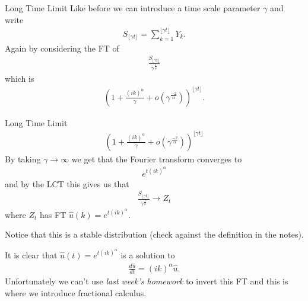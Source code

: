 \documentclass[pdf]{beamer}
\newcommand{\lra}{\longrightarrow}
\begin{document}
\begin{frame}{Long Time Limit}
    Like before we can introduce a time scale parameter $ \gamma $ and write
    \begin{align}
        S_{\lfloor \gamma t \rfloor} = \sum_{k=1}^{\lfloor \gamma t \rfloor}Y_k.
    \end{align}
    Again by considering the FT of 
    \begin{align}
        \frac{S_{\lfloor \gamma t \rfloor}}{\gamma^\frac{1}{\alpha}}
    \end{align}
    which is
    \begin{align}
        \left( 1 + \frac{(ik)^\alpha}{\gamma} + o(\gamma^\frac{-2}{\alpha})\right)^{\lfloor \gamma t \rfloor}.
    \end{align}
\end{frame}

\begin{frame}{Long Time Limit}
    \begin{align}
            \left( 1 + \frac{(ik)^\alpha}{\gamma} + o(\gamma^\frac{-2}{\alpha})\right)^{\lfloor \gamma t \rfloor}
    \end{align}
    By taking $ \gamma \lra \infty $ we get that the Fourier transform converges to
    \begin{align}
        e^{t(ik)^\alpha}
    \end{align}
    and by the LCT this gives us that 
    \begin{align}
        \frac{S_{\lfloor \gamma t \rfloor}}{\gamma^\frac{1}{\alpha}} \lra Z_t
    \end{align}
    where $ Z_t $ has FT $ \hat{u}(k) = e^{t(ik)^\alpha} $.
    
    Notice that this is a stable distribution (check against the definition in the notes).
\end{frame}
\begin{frame}
    It is clear that $ \hat{u}(t) = e^{t(ik)^\alpha} $ is a solution to
    \begin{align}
        \frac{d\hat{u}}{dt} = (ik)^\alpha \hat{u}.
    \end{align}
    Unfortunately we can't use \emph{last week's homework} to invert this FT and this is where we introduce fractional calculus.
\end{frame}
\end{document}
